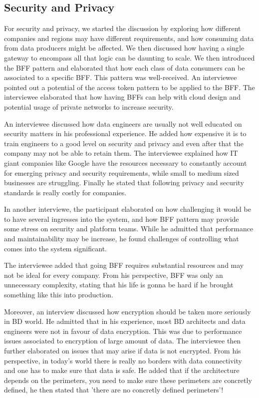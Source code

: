 \documentclass{bmcart}
\begin{document}
\subsection{Security and Privacy}

For security and privacy, we started the discussion by exploring how different companies and regions may have different requirements, and how consuming data from data producers might be affected. We then discussed how having a single gateway to encompass all that logic can be daunting to scale. We then introduced the BFF pattern and elaborated that how each class of data consumers can be associated to a specific BFF. This pattern was well-received. An interviewee pointed out a potential of the access token pattern to be applied to the BFF. The interviewee elaborated that how having BFFs can help with cloud design and potential usage of private networks to increase security. 

An interviewee discussed how data engineers are usually not well educated on security matters in his professional experience. He added how expensive it is to train engineers to a good level on security and privacy and even after that the company may not be able to retain them. The interviewee explained how IT giant companies like Google have the resources necessary to constantly account for emerging privacy and security requirements, while small to medium sized businesses are struggling. Finally he stated that following privacy and security standards is really costly for companies.

In another interviewe, the participant elaborated on how challenging it would be to have several ingresses into the system, and how BFF pattern may provide some stress on security and platform teams. While he admitted that performance and maintainability may be increase, he found challenges of controlling what comes into the system significant. 

The interviewee added that going BFF requires substantial resources and may not be ideal for every company. From his perspective, BFF was only an unnecessary complexity, stating that his life is gonna be hard if he brought something like this into production.

Moreover, an interview discussed how encryption should be taken more seriously in BD world. He admitted that in his experience, most BD architects and data engineers were not in favour of data encryption. This was due to performance issues associated to encryption of large amount of data. The interviewee then further elaborated on issues that may arise if data is not encrypted. From his perspective, in today's world there is really no borders with data connectivity and one has to make sure that data is safe. He added that if the architecture depends on the perimeters, you need to make sure these perimeters are concretly defined, he then stated that 'there are no concretly defined perimeters'! 
\end{document}
